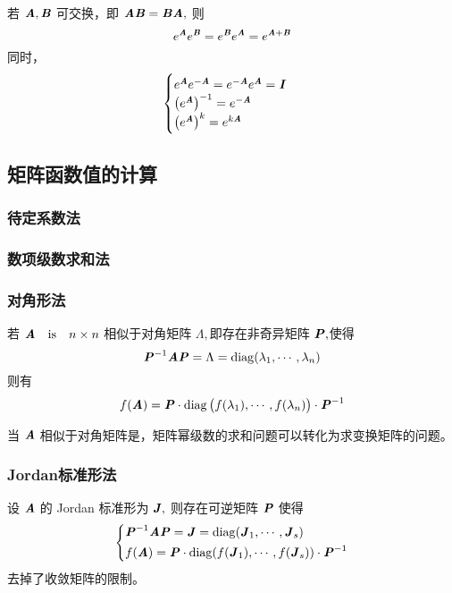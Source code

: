 \begin{theorem}
    若 $\MA, \MB$ 可交换，即 $\MA \MB = \MB \MA,$ 则
    \[
        e^{\MA} e^{\MB} = e^{\MB} e^{\MA} = e^{\MA + \MB}
    \]
    同时，
    \[
        \begin{cases}
            e^{\MA} e^{-\MA} = e^{-\MA} e^{\MA} = \MI \\
            \left( e^{\MA} \right)^{-1} = e^{-\MA} \\
            \left( e^{\MA} \right)^{k} = e^{k\MA}
        \end{cases}
    \]
\end{theorem}

\subsection{矩阵函数值的计算}
\label{sub:矩阵函数值的计算}

\subsubsection{待定系数法}
\label{ssub:待定系数法}

\subsubsection{数项级数求和法}
\label{ssub:数项级数求和法}

\subsubsection{对角形法}
\label{ssub:对角形法}

若 $\ann$ 相似于对角矩阵 $\Lambda,$即存在非奇异矩阵 $\MP,$使得
\[
    \MP^{-1} \MA \MP = \Lambda = \mathrm{diag}(\lambda_1, \cdots, \lambda_n)
\]
则有
\[
    f(\MA) = \MP \cdot \mathrm{diag}\left(f(\lambda_1), \cdots, f(\lambda_n)\right) \cdot \MP^{-1}
\]

当 $\MA$ 相似于对角矩阵是，矩阵幂级数的求和问题可以转化为求变换矩阵的问题。
\subsubsection{Jordan标准形法}
\label{ssub:Jordan标准形法}

\begin{definition}
    设 $\MA$ 的 Jordan 标准形为 $\MJ,$ 则存在可逆矩阵 $\MP$ 使得
    \[
        \begin{dcases}
            \MP^{-1} \MA \MP = \MJ = \mathrm{diag}(\MJ_1, \cdots, \MJ_s) \\
            f(\MA) = \MP \cdot \mathrm{diag}(f(\MJ_1), \cdots, f(\MJ_s)) \cdot \MP^{-1}
        \end{dcases}
    \]
    去掉了收敛矩阵的限制。
\end{definition}


